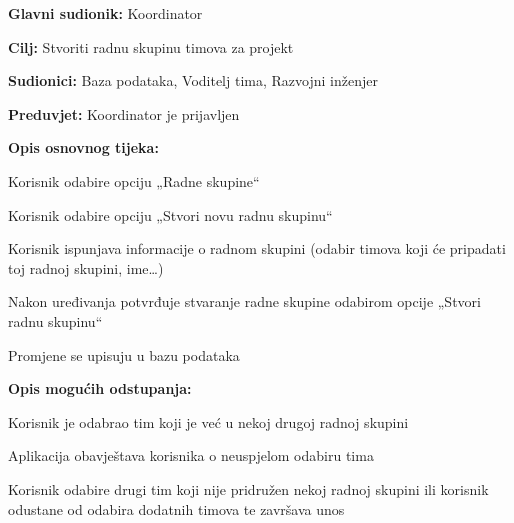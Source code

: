 							\noindent {}
							\begin{packed_item}
		
								\item \textbf{Glavni sudionik:} Koordinator
								\item  \textbf{Cilj:} Stvoriti radnu skupinu timova za projekt
								\item  \textbf{Sudionici:} Baza podataka, Voditelj tima, Razvojni inženjer
								\item  \textbf{Preduvjet:} Koordinator je prijavljen
								\item  \textbf{Opis osnovnog tijeka:}
		
								\item[] \begin{packed_enum}

                          			\item Korisnik odabire opciju „Radne skupine“
									\item Korisnik odabire opciju „Stvori novu radnu skupinu“
									\item Korisnik ispunjava informacije o radnom skupini (odabir timova koji će pripadati toj 		radnoj skupini, ime…)
									\item Nakon uređivanja potvrđuje stvaranje radne skupine odabirom opcije „Stvori radnu skupinu“
									\item Promjene se upisuju u bazu podataka
										\end{packed_enum}
            
           						\item  \textbf{Opis mogućih odstupanja:}
		
									\item[] \begin{packed_item}
			
									\item[3.a] Korisnik je odabrao tim koji je već u nekoj drugoj radnoj skupini
			  							\item[] \begin{packed_enum}
											\item Aplikacija obavještava korisnika o neuspjelom odabiru tima
                                      		\item Korisnik odabire drugi tim koji nije pridružen nekoj radnoj skupini ili korisnik   odustane od odabira dodatnih timova te završava unos
												\end{packed_enum}
 

\end{packed_item}
\end{packed_item}
